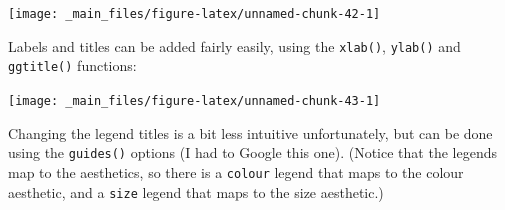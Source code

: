 \documentclass[]{book}
\newenvironment{Shaded}{\begin{snugshade}}{\end{snugshade}}
\newcommand{\KeywordTok}[1]{\textcolor[rgb]{0.13,0.29,0.53}{\textbf{{#1}}}}
\newcommand{\DataTypeTok}[1]{\textcolor[rgb]{0.13,0.29,0.53}{{#1}}}
\newcommand{\DecValTok}[1]{\textcolor[rgb]{0.00,0.00,0.81}{{#1}}}
\newcommand{\StringTok}[1]{\textcolor[rgb]{0.31,0.60,0.02}{{#1}}}
\newcommand{\NormalTok}[1]{{#1}}
\theoremstyle{definition}
\theoremstyle{definition}
\theoremstyle{definition}
\theoremstyle{remark}
\begin{document}
\begin{center}\texttt{[image: \_main\_files/figure-latex/unnamed-chunk-42-1]} \end{center}

Labels and titles can be added fairly easily, using the \texttt{xlab()},
\texttt{ylab()} and \texttt{ggtitle()} functions:

\begin{Shaded}
\end{Shaded}

\begin{center}\texttt{[image: \_main\_files/figure-latex/unnamed-chunk-43-1]} \end{center}

Changing the legend titles is a bit less intuitive unfortunately, but
can be done using the \texttt{guides()} options (I had to Google this
one). (Notice that the legends map to the aesthetics, so there is a
\texttt{colour} legend that maps to the colour aesthetic, and a
\texttt{size} legend that maps to the size aesthetic.)
\end{document}

